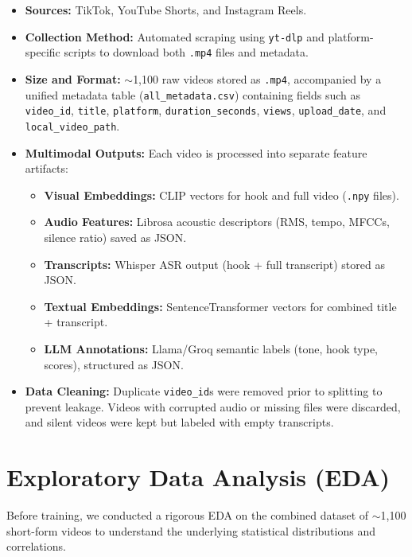 \begin{itemize}
    \item \textbf{Sources:} TikTok, YouTube Shorts, and Instagram Reels.
    \item \textbf{Collection Method:} Automated scraping using \texttt{yt-dlp} and platform-specific scripts to download both \texttt{.mp4} files and metadata.
    \item \textbf{Size and Format:} $\sim$1,100 raw videos stored as \texttt{.mp4}, accompanied by a unified metadata table (\texttt{all\_metadata.csv}) containing fields such as \texttt{video\_id}, \texttt{title}, \texttt{platform}, \texttt{duration\_seconds}, \texttt{views}, \texttt{upload\_date}, and \texttt{local\_video\_path}.
    \item \textbf{Multimodal Outputs:} Each video is processed into separate feature artifacts: 
    \begin{itemize}
        \item \textbf{Visual Embeddings:} CLIP vectors for hook and full video (\texttt{.npy} files).
        \item \textbf{Audio Features:} Librosa acoustic descriptors (RMS, tempo, MFCCs, silence ratio) saved as JSON.
        \item \textbf{Transcripts:} Whisper ASR output (hook + full transcript) stored as JSON.
        \item \textbf{Textual Embeddings:} SentenceTransformer vectors for combined title + transcript.
        \item \textbf{LLM Annotations:} Llama/Groq semantic labels (tone, hook type, scores), structured as JSON.
    \end{itemize}
    \item \textbf{Data Cleaning:} Duplicate \texttt{video\_id}s were removed prior to splitting to prevent leakage. Videos with corrupted audio or missing files were discarded, and silent videos were kept but labeled with empty transcripts.
\end{itemize}

\section{Exploratory Data Analysis (EDA)}
Before training, we conducted a rigorous EDA on the combined dataset of $\sim$1,100 short-form videos to understand the underlying statistical distributions and correlations.

